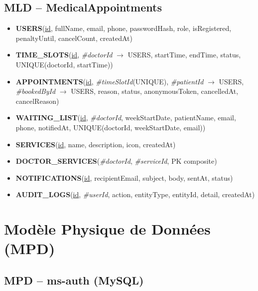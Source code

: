 \subsection{MLD -- MedicalAppointments}
\begin{itemize}[itemsep=2pt]
  \item \textbf{USERS}(\underline{id}, fullName, email, phone, passwordHash, role, isRegistered, penaltyUntil, cancelCount, createdAt)
  \item \textbf{TIME\_SLOTS}(\underline{id}, \textit{\#doctorId} $\to$ USERS, startTime, endTime, status, UNIQUE(doctorId, startTime))
  \item \textbf{APPOINTMENTS}(\underline{id}, \textit{\#timeSlotId}(UNIQUE), \textit{\#patientId} $\to$ USERS, \textit{\#bookedById} $\to$ USERS, reason, status, anonymousToken, cancelledAt, cancelReason)
  \item \textbf{WAITING\_LIST}(\underline{id}, \textit{\#doctorId}, weekStartDate, patientName, email, phone, notifiedAt, UNIQUE(doctorId, weekStartDate, email))
  \item \textbf{SERVICES}(\underline{id}, name, description, icon, createdAt)
  \item \textbf{DOCTOR\_SERVICES}(\textit{\#doctorId}, \textit{\#serviceId}, PK composite)
  \item \textbf{NOTIFICATIONS}(\underline{id}, recipientEmail, subject, body, sentAt, status)
  \item \textbf{AUDIT\_LOGS}(\underline{id}, \textit{\#userId}, action, entityType, entityId, detail, createdAt)
\end{itemize}

\section{Modèle Physique de Données (MPD)}

\subsection{MPD -- ms-auth (MySQL)}

